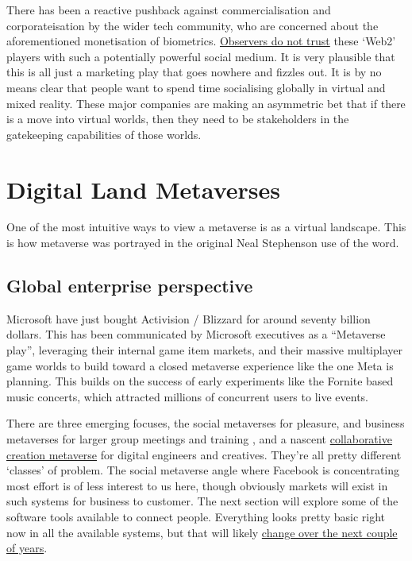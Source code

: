 There has been a reactive pushback against commercialisation and corporateisation by the wider tech community, who are concerned about the aforementioned monetisation of biometrics. \href{https://www.coindesk.com/layer2/2022/01/19/meta-leans-in-to-tracking-your-emotions-in-the-metaverse/}{Observers do not trust} these `Web2' players with such a potentially powerful social medium. It is very plausible that this is all just a marketing play that goes nowhere and fizzles out. It is by no means clear that people want to spend time socialising globally in virtual and mixed reality. These major companies are  making an asymmetric bet that if there is a move into virtual worlds, then they need to be stakeholders in the gatekeeping capabilities of those worlds.\section{Digital Land Metaverses}
One of the most intuitive ways to view a metaverse is as a virtual landscape. This is how metaverse was portrayed in the original Neal Stephenson use of the word. \subsection{Global enterprise perspective}
Microsoft have just bought Activision / Blizzard for around seventy billion dollars. This has been communicated by Microsoft executives as a ``Metaverse play'', leveraging their internal game item markets, and their massive multiplayer game worlds to build toward a closed metaverse experience like the one Meta is planning.
This builds on the success of early experiments like the Fornite based music concerts, which attracted millions of concurrent users to live events.

There are three emerging focuses, the social metaverses for pleasure, and business metaverses for larger group meetings and training \cite{heiphetz2010training, aldrich2005learning}, and a nascent \href{https://blogs.nvidia.com/blog/2022/01/04/omniverse-available-free-to-creators/}{collaborative creation metaverse} for digital engineers and creatives. They're all pretty different `classes' of problem. The social metaverse angle where Facebook is concentrating most effort is of less interest to us here, though obviously markets will exist in such systems for business to customer. The next section will explore some of the software tools available to connect people. Everything looks pretty basic right now in all the available systems, but that will likely \href{https://www.youtube.com/watch?v=cRLnR4Kot2M}{change over the next couple of years}.

